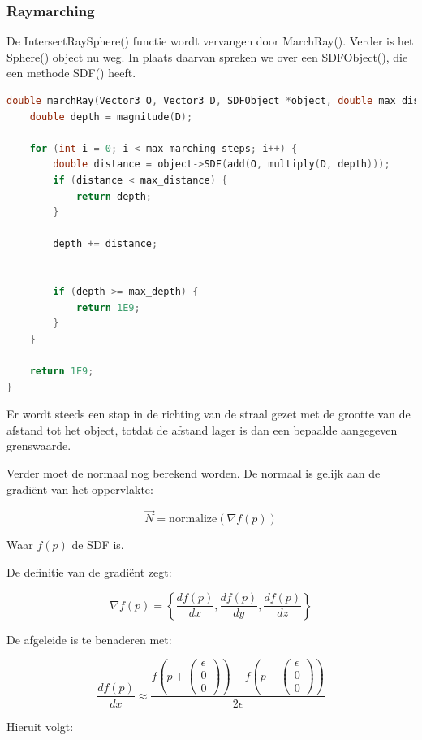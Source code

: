 \documentclass[12pt, a4paper]{article}
\newcommand*{\ora}{\overrightarrow}
\begin{document}
\subsubsection{Raymarching}

De IntersectRaySphere() functie wordt vervangen door MarchRay(). Verder is het Sphere() object nu weg. In plaats daarvan spreken we over een SDFObject(), die een methode SDF() heeft.

\begin{lstlisting}[language=C++]
double marchRay(Vector3 O, Vector3 D, SDFObject *object, double max_distance, int max_marching_steps, double max_depth) {
    double depth = magnitude(D);

    for (int i = 0; i < max_marching_steps; i++) {
        double distance = object->SDF(add(O, multiply(D, depth)));
        if (distance < max_distance) {
            return depth;
        }

        depth += distance;


        if (depth >= max_depth) {
            return 1E9;
        }
    }

    return 1E9;
}
\end{lstlisting}

Er wordt steeds een stap in de richting van de straal gezet met de grootte van de afstand tot het object, totdat de afstand lager is dan een bepaalde aangegeven grenswaarde.

Verder moet de normaal nog berekend worden. De normaal is gelijk aan de gradiënt van het oppervlakte:

\[\ora{N} = \text{normalize}(\nabla f(p))\]

Waar $f(p)$ de SDF is.

De definitie van de gradiënt zegt:

\[\nabla f(p)=\left\{\frac{df(p)}{dx},\frac{df(p)}{dy},\frac{df(p)}{dz}\right\}\]

De afgeleide is te benaderen met:

\[\frac{df(p)}{dx}\approx\frac{f\left(p+\begin{pmatrix} \epsilon \\ 0 \\ 0 \end{pmatrix}\right)-f\left(p-\begin{pmatrix} \epsilon \\ 0 \\ 0 \end{pmatrix}\right)}{2\epsilon}\]

Hieruit volgt:
\end{document}
